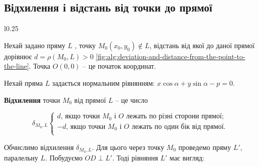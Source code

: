 \subsection{Відхилення і відстань від точки до прямої}
\begin{wrapfigure}{l}{0.25\textwidth}
    \caption{Відхилення і відстань від точки до прямої}
    \label{fig:alg:deviation-and-distance-from-the-point-to-the-line}
\end{wrapfigure}

Нехай задано пряму $L$ , точку $M_0(x_0,y_0)\not\in L$,
відстань від якої до даної прямої дорівнює
$d = \rho(M_0, L) > 0$ \ref{fig:alg:deviation-and-distance-from-the-point-to-the-line}. Точка $O(0,0)$ -- це
початок координат.

Нехай пряма $L$ задається нормальним
рівнянням: $x\cos\alpha + y\sin\alpha - p = 0$.


\begin{definition}
	\textbf{Відхилення} точки $M_0$ від прямої $L$ -- це число

	$$\delta_{M_0,L}\left\{\begin{array}{l}
		d\text{, якщо точки } M_0 \text{ і } O \text{ лежать по різні сторони прямої;} \\
		-d\text{, якщо точки } M_0 \text{ і } O \text{ лежать по один бік від прямої.} \\
	\end{array}\right.$$
\end{definition}


Обчислимо відхилення $\delta_{M_0,L}$. Для цього через точку $M_0$ проведемо пряму $L'$,
паралельну $L$. Побудуємо $OD \perp L'$. Тоді рівняння $L'$ має вигляд:

